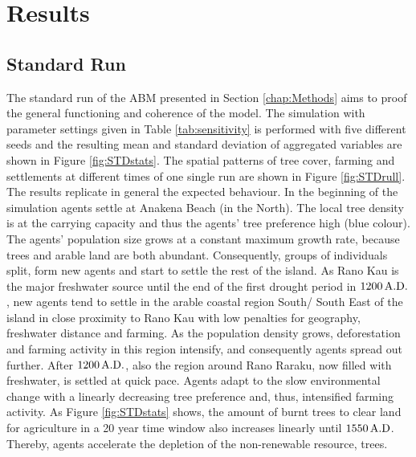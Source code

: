 \chapter{Results}

\section{Standard Run}
The standard run of the ABM presented in Section \ref{chap:Methods} aims to proof the general functioning and coherence of the model.
The simulation with parameter settings given in Table \ref{tab:sensitivity} is performed with five different seeds and the resulting mean and standard deviation of aggregated variables are shown in Figure \ref{fig:STDstats}.
The spatial patterns of tree cover, farming and settlements at different times of one single run are shown in Figure \ref{fig:STDrull}.
The results replicate in general the expected behaviour. 
In the beginning of the simulation agents settle at Anakena Beach (in the North). 
The local tree density is at the carrying capacity and thus the agents' tree preference high (blue colour).
The agents' population size grows at a constant maximum growth rate, because trees and arable land are both abundant. 
Consequently, groups of individuals split, form new agents and start to settle the rest of the island.
As Rano Kau is the major freshwater source until the end of the first drought period in $1200\, {\rm A.D.}$, new agents tend to settle in the arable coastal region South/ South East of the island in close proximity to Rano Kau with low penalties for geography, freshwater distance and farming. 
As the population density grows, deforestation and farming activity in this region intensify, and consequently agents spread out further.
After $1200\, {\rm A.D.}$, also the region around Rano Raraku, now filled with freshwater, is settled at quick pace.
Agents adapt to the slow environmental change with a linearly decreasing tree preference and, thus, intensified farming activity.
As Figure \ref{fig:STDstats} shows, the amount of burnt trees to clear land for agriculture in a 20 year time window also increases linearly until $1550\, {\rm A.D}$.
Thereby, agents accelerate the depletion of the non-renewable resource, trees.


